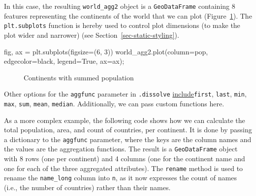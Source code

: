 \documentclass[
  letterpaper,
]{krantz}
\newenvironment{Shaded}{\begin{snugshade}}{\end{snugshade}}
\newcommand{\DecValTok}[1]{\textcolor[rgb]{0.68,0.00,0.00}{#1}}
\newcommand{\NormalTok}[1]{\textcolor[rgb]{0.00,0.23,0.31}{#1}}
\newcommand{\OperatorTok}[1]{\textcolor[rgb]{0.37,0.37,0.37}{#1}}
\newcommand{\StringTok}[1]{\textcolor[rgb]{0.13,0.47,0.30}{#1}}
\newcommand{\VariableTok}[1]{\textcolor[rgb]{0.07,0.07,0.07}{#1}}
\begin{document}
In this case, the resulting \texttt{world\_agg2} object is a
\texttt{GeoDataFrame} containing 8 features representing the continents
of the world that we can plot (Figure~\ref{fig-spatial-aggregation}).
The \texttt{plt.subplots} function is hereby used to control plot
dimensions (to make the plot wider and narrower) (see
Section~\ref{sec-static-styling}).

\begin{Shaded}
\begin{Highlighting}[]
\NormalTok{fig, ax }\OperatorTok{=}\NormalTok{ plt.subplots(figsize}\OperatorTok{=}\NormalTok{(}\DecValTok{6}\NormalTok{, }\DecValTok{3}\NormalTok{))}
\NormalTok{world\_agg2.plot(column}\OperatorTok{=}\StringTok{\textquotesingle{}pop\textquotesingle{}}\NormalTok{, edgecolor}\OperatorTok{=}\StringTok{\textquotesingle{}black\textquotesingle{}}\NormalTok{, legend}\OperatorTok{=}\VariableTok{True}\NormalTok{, ax}\OperatorTok{=}\NormalTok{ax)}\OperatorTok{;}
\end{Highlighting}
\end{Shaded}

\begin{figure}[H]


\caption{\label{fig-spatial-aggregation}Continents with summed
population}

\end{figure}%

Other options for the \texttt{aggfunc} parameter in \texttt{.dissolve}
\href{https://geopandas.org/en/stable/docs/user_guide/aggregation_with_dissolve.html}{include}\texttt{\textquotesingle{}first\textquotesingle{}},
\texttt{\textquotesingle{}last\textquotesingle{}},
\texttt{\textquotesingle{}min\textquotesingle{}},
\texttt{\textquotesingle{}max\textquotesingle{}},
\texttt{\textquotesingle{}sum\textquotesingle{}},
\texttt{\textquotesingle{}mean\textquotesingle{}},
\texttt{\textquotesingle{}median\textquotesingle{}}. Additionally, we
can pass custom functions here.

As a more complex example, the following code shows how we can calculate
the total population, area, and count of countries, per continent. It is
done by passing a dictionary to the \texttt{aggfunc} parameter, where
the keys are the column names and the values are the aggregation
functions. The result is a \texttt{GeoDataFrame} object with 8 rows (one
per continent) and 4 columns (one for the continent name and one for
each of the three aggregated attributes). The \texttt{rename} method is
used to rename the
\texttt{\textquotesingle{}name\_long\textquotesingle{}} column into
\texttt{\textquotesingle{}n\textquotesingle{}}, as it now expresses the
count of names (i.e., the number of countries) rather than their names.
\end{document}
